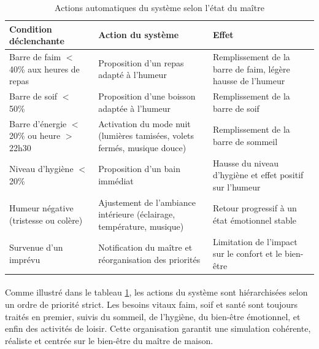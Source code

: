 \begin{table}[h!]
\centering
\begin{tabular}{|p{4cm}|p{4cm}|p{5cm}|}
\hline
\textbf{Condition déclenchante} & \textbf{Action du système} & \textbf{Effet} \\
\hline
Barre de faim $<$ 40\% aux heures de repas & Proposition d'un repas adapté 
à l'humeur & Remplissement de la barre de faim, légère hausse de l'humeur \\
\hline
Barre de soif $<$ 50\% & Proposition d'une boisson adaptée à l'humeur & 
Remplissement de la barre de soif \\
\hline
Barre d'énergie $<$ 20\% ou heure $>$ 22h30 & Activation du mode nuit 
(lumières tamisées, volets fermés, musique douce) & Remplissement de 
la barre de sommeil \\
\hline
Niveau d'hygiène $<$ 20\% & Proposition d'un bain immédiat & Hausse 
du niveau d'hygiène et effet positif sur l'humeur \\
\hline
Humeur négative (tristesse ou colère) & Ajustement de l'ambiance intérieure 
(éclairage, température, musique) & Retour progressif à un état 
émotionnel stable \\
\hline
Survenue d'un imprévu & Notification du maître et réorganisation 
des priorités & Limitation de l'impact sur le confort et le bien-être \\
\hline
\end{tabular}
\caption{Actions automatiques du système selon l'état du maître}
\label{tab:actions}
\end{table}

\paragraph{} Comme illustré dans le tableau \ref{tab:actions}, les actions du système 
sont hiérarchisées selon un ordre de priorité strict. Les besoins vitaux faim, soif 
et santé  sont toujours traités en premier, suivis du sommeil, de l'hygiène, du 
bien-être émotionnel, et enfin des activités de loisir. Cette organisation garantit 
une simulation cohérente, réaliste et centrée sur le bien-être du maître de maison.

